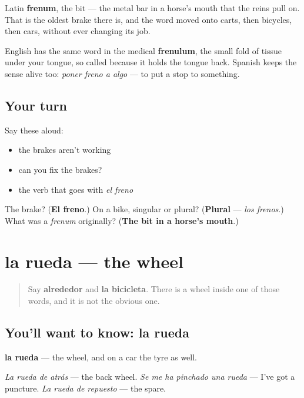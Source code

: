 \begin{cousinweb}
Latin \textbf{frenum}, the bit — the metal bar in a horse's mouth that the reins pull on. That is the oldest brake there is, and the word moved onto carts, then bicycles, then cars, without ever changing its job.

English has the same word in the medical \textbf{frenulum}, the small fold of tissue under your tongue, so called because it holds the tongue back. Spanish keeps the sense alive too: \emph{poner freno a algo} — to put a stop to something.
\end{cousinweb}

\subsection*{Your turn}
Say these aloud:

\begin{itemize}
\raggedright
  \item the brakes aren't working
  \item can you fix the brakes?
  \item the verb that goes with \emph{el freno}
\end{itemize}

\begin{tcolorbox}[breakable,colback=teal!4,colframe=teal!35!black,title={Before you move on}]
The brake? (\textbf{El freno}.) On a bike, singular or plural? (\textbf{Plural} — \emph{los frenos}.) What was a \emph{frenum} originally? (\textbf{The bit in a horse's mouth}.)
\end{tcolorbox}
\section[la rueda]{la rueda — the wheel}

\label{lesson:ES-C449-rueda}



\begin{quote}
Say \textbf{alrededor} and \textbf{la bicicleta}. There is a wheel inside one of those words, and it is not the obvious one.
\end{quote}

\subsection*{You'll want to know: la rueda}
\textbf{la rueda} — the wheel, and on a car the tyre as well.

\emph{La rueda de atrás} — the back wheel. \emph{Se me ha pinchado una rueda} — I've got a puncture. \emph{La rueda de repuesto} — the spare.

